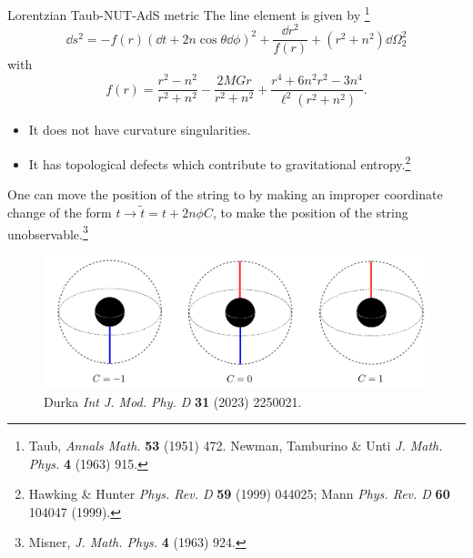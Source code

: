 \documentclass[aspectratio=169,xcolor=dvipsnames]{beamer}
\begin{document}
\begin{frame}{Lorentzian Taub-NUT-AdS metric}\justifying
The line element is given by \footnote{Taub, \textit{Annals Math.} \textbf{53} (1951) 472. Newman, Tamburino \& Unti \textit{J. Math. Phys.} \textbf{4} (1963) 915.}
\begin{equation*}
    \dd s^2=-f(r)(\dd t+2n\cos\theta\dd\phi)^2+\frac{\dd r^2}{f(r)}+(r^2+n^2)\dd\Omega^2_2
\end{equation*}
with
\begin{equation*}
    f(r)=\frac{r^2-n^2}{r^2+n^2}-\frac{2MGr}{r^2+n^2}+\frac{r^4+6n^2r^2-3n^4}{\ell^2(r^2+n^2)}.
\end{equation*}
\begin{itemize}
    \item It does not have curvature singularities.
    \item It has topological defects which contribute to gravitational entropy.\footnote{Hawking \& Hunter \textit{Phys. Rev. D} \textbf{59} (1999) 044025; Mann \textit{Phys. Rev. D} \textbf{60} 104047 (1999).}
\end{itemize}
\end{frame}

\begin{frame}\justifying
One can move the position of the string to by making an improper coordinate change of the form $t\to \tilde{t}=t+2n\phi C$, to make the position of the string unobservable.\footnote{Misner, \textit{J. Math. Phys.} \textbf{4} (1963) 924.}
\begin{figure}
    \centering
    \includegraphics[scale=0.40]{Captura de pantalla 2024-01-08 a la(s) 14.33.59.png}
    \caption{Durka \textit{Int J. Mod. Phy. D} \textbf{31} (2023) 2250021.}
\end{figure}
\end{frame}
\end{document}
